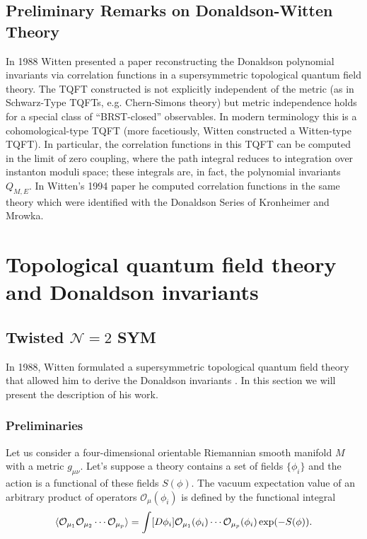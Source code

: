 \documentclass[12pt, onecolumn]{article}
\begin{document}
\subsection{Preliminary Remarks on Donaldson-Witten Theory}
In 1988 Witten presented a paper reconstructing the Donaldson polynomial invariants via correlation functions in a supersymmetric topological quantum field theory.  The TQFT constructed is not explicitly independent of the metric (as in Schwarz-Type TQFTs, e.g. Chern-Simons theory) but metric independence holds for a special class of ``BRST-closed'' observables.  In modern terminology this is a cohomological-type TQFT (more facetiously, Witten constructed a Witten-type TQFT).  In particular, the correlation functions in this TQFT can be computed in the limit of zero coupling, where the path integral reduces to integration over instanton moduli space; these integrals are, in fact, the polynomial invariants $Q_{M,E}$.  In Witten's 1994 paper he computed correlation functions in the same theory which were identified with the Donaldson Series of Kronheimer and Mrowka.

\section{Topological quantum field theory and Donaldson invariants}
\subsection{Twisted $\mathcal{N}=2$ SYM}

In 1988, Witten formulated a supersymmetric topological quantum field theory that allowed him to derive the Donaldson invariants \cite{Witten_1988}. In this section we will present the description of his work.

\subsubsection{\label{pre} Preliminaries}

Let us consider a four-dimensional orientable Riemannian smooth manifold $M$ with a metric $g_{\mu\nu}$. Let's suppose a theory contains a set of fields $\{\phi_i\}$  and the action is a functional of these fields $S(\phi)$. The vacuum expectation value of an arbitrary product of operators $\mathcal{O}_\mu(\phi_i)$ is defined by the functional integral
\begin{equation}
\langle\mathcal{O}_{\mu_1}\mathcal{O}_{\mu_2}\cdots\mathcal{O}_{\mu_p}\rangle=\int[D\phi_i]\mathcal{O}_{\mu_1}(\phi_i)\cdots\mathcal{O}_{\mu_p}(\phi_i)\,{\rm exp}(-S(\phi)). \label{vev-op}
\end{equation}
\end{document}
